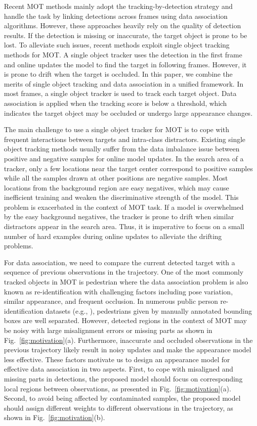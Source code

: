 \documentclass[runningheads]{llncs}
\begin{document}
  Recent MOT methods mainly adopt the tracking-by-detection strategy and handle the task by linking detections across frames using data association algorithms. 
However, these approaches heavily rely on the quality of detection results. 
If the detection is missing or inaccurate, the target object is prone to be lost. 
To alleviate such issues, recent methods \cite{MDP,STAM} exploit single object tracking methods for MOT. 
A single object tracker uses the detection in the first frame and online updates the model to find the target in following frames.
However, it is prone to drift when the target is occluded.
In this paper, we combine the merits of single object tracking and data association in a unified framework. 
In most frames, a single object tracker is used to track each target object.
Data association is applied when the tracking score is below a threshold, which indicates the target object may be occluded or undergo large appearance changes.


  The main challenge to use a single object tracker for MOT is to cope with frequent interactions between targets and intra-class distractors.
Existing single object tracking methods usually suffer from the data imbalance issue between positive and negative samples for online model updates. 
In the search area of a tracker, only a few locations near the target center correspond to positive samples while all the samples drawn at other positions are negative samples.
Most locations from the background region are easy negatives, which may cause inefficient training and weaken the discriminative strength of the model. 
This problem is exacerbated in the context of MOT task. 
If a model is overwhelmed by the easy background negatives, the tracker is prone to drift when similar distractors appear in the search area. 
Thus, it is imperative to focus on a small number of hard examples during online updates to alleviate the drifting problems. 
  
  For data association, we need to compare the current detected target with a sequence of previous observations in the trajectory. 
One of the most commonly tracked objects in MOT is pedestrian where the data association problem is also known as re-identification with challenging factors including pose variation, similar appearance, and frequent occlusion.
In numerous public person re-identification datasets (e.g., \cite{CUHK01,CUHK02,CUHK03}), pedestrians given by manually annotated bounding boxes are well separated. 
However, detected regions in the context of MOT may be noisy with large misalignment errors or missing parts 
  as shown in Fig.~\ref{fig:motivation}(a). 
Furthermore, inaccurate and occluded observations in the previous trajectory likely result in noisy updates and make the appearance model less effective. 
These factors motivate us to design an appearance model for effective data association in two aspects.
First, to cope with misaligned and missing parts in detections, the proposed model should focus on corresponding local regions between observations, as presented in Fig.~\ref{fig:motivation}(a).
Second, to avoid being affected by contaminated samples, the proposed model should assign different weights to different observations in the trajectory, as shown in Fig.~\ref{fig:motivation}(b).
  
\end{document}

